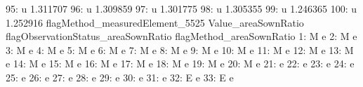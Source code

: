 \documentclass[nojss]{jss}
\begin{document}
\begin{Schunk}
\begin{Soutput}
 95:                               u            1.311707
 96:                               u            1.309859
 97:                               u            1.301775
 98:                               u            1.305355
 99:                               u            1.246365
100:                               u            1.252916
     flagMethod_measuredElement_5525 Value_areaSownRatio
     flagObservationStatus_areaSownRatio flagMethod_areaSownRatio
  1:                                   M                        e
  2:                                   M                        e
  3:                                   M                        e
  4:                                   M                        e
  5:                                   M                        e
  6:                                   M                        e
  7:                                   M                        e
  8:                                   M                        e
  9:                                   M                        e
 10:                                   M                        e
 11:                                   M                        e
 12:                                   M                        e
 13:                                   M                        e
 14:                                   M                        e
 15:                                   M                        e
 16:                                   M                        e
 17:                                   M                        e
 18:                                   M                        e
 19:                                   M                        e
 20:                                   M                        e
 21:                                                            e
 22:                                                            e
 23:                                                            e
 24:                                                            e
 25:                                                            e
 26:                                                            e
 27:                                                            e
 28:                                                            e
 29:                                                            e
 30:                                                            e
 31:                                                            e
 32:                                   E                        e
 33:                                   E                        e

\end{Soutput}
\end{Schunk}
\end{document}
